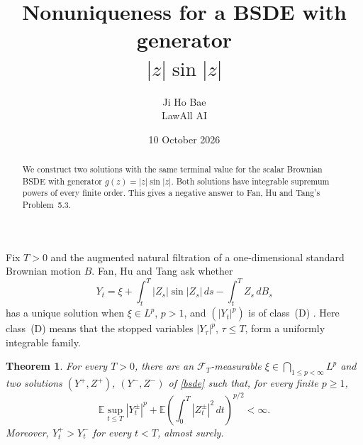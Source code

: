 \documentclass[11pt]{article}
\title{Nonuniqueness for a BSDE with generator\texorpdfstring{\\$|z|\sin|z|$}{ |z| sin |z|}}
\author{Ji Ho Bae\\\small LawAll AI}
\date{10 October 2026}
\newcommand{\E}{\mathbb E}
\newtheorem{theorem}{Theorem}
\begin{document}
\maketitle

\begin{abstract}
We construct two solutions with the same terminal value for the scalar
Brownian BSDE with generator $g(z)=|z|\sin|z|$. Both solutions have
integrable supremum powers of every finite order. This gives a negative
answer to Fan, Hu and Tang's Problem~5.3.
\end{abstract}

Fix $T>0$ and the augmented natural filtration of a one-dimensional
standard Brownian motion $B$. Fan, Hu and Tang ask whether
\begin{equation}\label{bsde}
 Y_t=\xi+\int_t^T |Z_s|\sin|Z_s|\,ds-\int_t^T Z_s\,dB_s
\end{equation}
has a unique solution when $\xi\in L^p$, $p>1$, and $(|Y_t|^p)$ is of
class~(D) \cite[Problem~5.3, equation~(5.2)]{FHT}. Here class~(D) means
that the stopped variables $|Y_\tau|^p$, $\tau\le T$, form a uniformly
integrable family.

\begin{theorem}\label{main}
For every $T>0$, there are an $\mathcal F_T$-measurable
$\xi\in\bigcap_{1\le p<\infty}L^p$ and two solutions
$(Y^+,Z^+)$, $(Y^-,Z^-)$ of \eqref{bsde} such that, for every finite
$p\ge1$,
\[
 \E\sup_{t\le T}|Y_t^\pm|^p+
 \E\left(\int_0^T|Z_t^\pm|^2\,dt\right)^{p/2}<\infty.
\]
Moreover, $Y_t^+>Y_t^-$ for every $t<T$, almost surely.
\end{theorem}
\end{document}
